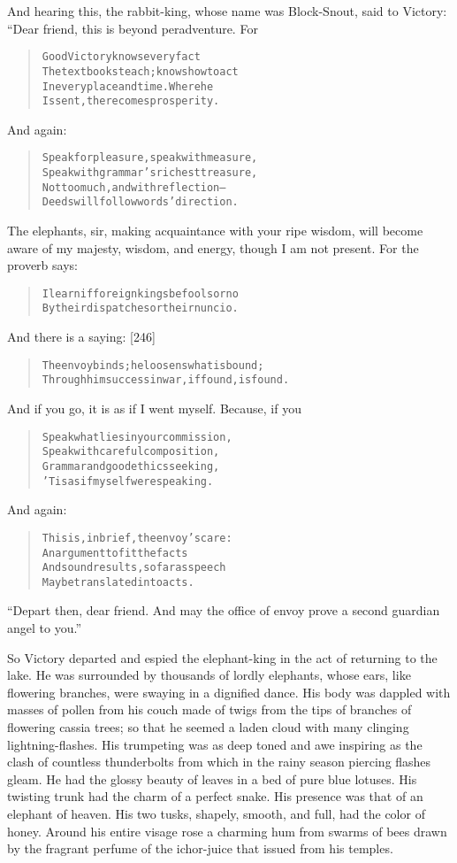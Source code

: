 \documentclass[article, twoside, 14pt]{memoir}
\renewenvironment{verbatim}{%
\begin{quote}%
\vskip -10pt%
\begin{alltt}\normalfont\large}{\end{alltt}%
\end{quote}%
\vskip -10pt
} %
\begin{document}
And hearing this, the rabbit-king, whose name was Block-Snout, said
to Victory: “Dear friend, this is beyond peradventure. For

\begin{verbatim}
Good Victory knows every fact
The textbooks teach; knows how to act
In every place and time. Where he
Is sent, there comes prosperity.
\end{verbatim}
And again:

\begin{verbatim}
Speak for pleasure, speak with measure,
Speak with grammar's richest treasure,
Not too much, and with reflection--
Deeds will follow words' direction.
\end{verbatim}
The elephants, sir, making acquaintance with your ripe wisdom, will
become aware of my majesty, wisdom, and energy, though I am not
present. For the proverb says:

\begin{verbatim}
I learn if foreign kings be fools or no
By their dispatches or their nuncio.
\end{verbatim}
And there is a saying: [246]

\begin{verbatim}
The envoy binds; he loosens what is bound;
Through him success in war, if found, is found.
\end{verbatim}
And if you go, it is as if I went myself. Because, if you

\begin{verbatim}
Speak what lies in your commission,
Speak with careful composition,
Grammar and good ethics seeking,
'Tis as if myself were speaking.
\end{verbatim}
And again:

\begin{verbatim}
This is, in brief, the envoy's care:
    An argument to fit the facts
And sound results, so far as speech
    May be translated into acts.
\end{verbatim}
``Depart then, dear friend. And may the office of envoy prove a second guardian angel to you.''

So Victory departed and espied the elephant-king in the act of
returning to the lake. He was surrounded by thousands of lordly
elephants, whose ears, like flowering branches, were swaying in a
dignified dance. His body was dappled with masses of pollen from
his couch made of twigs from the tips of branches of flowering
cassia trees; so that he seemed a laden cloud with many clinging
lightning-flashes. His trumpeting was as deep toned and awe
inspiring as the clash of countless thunderbolts from which in the
rainy season piercing flashes gleam. He had the glossy beauty of
leaves in a bed of pure blue lotuses. His twisting trunk had the
charm of a perfect snake. His presence was that of an elephant of
heaven. His two tusks, shapely, smooth, and full, had the color of
honey. Around his entire visage rose a charming hum from swarms of
bees drawn by the fragrant perfume of the ichor-juice that issued
from his temples.
\end{document}
